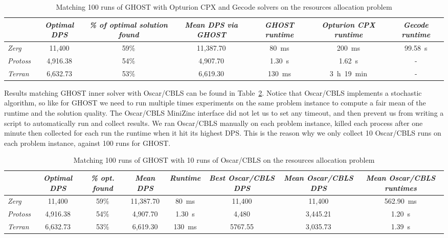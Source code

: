 \documentclass[journal]{IEEEtran}
\newcommand{\ghost}{\textsc{GHOST}\xspace}
\begin{document}
{%
\begin{table}[ht]
  \caption{Matching 100  runs of \ghost  with Opturion CPX  and Gecode
    solvers on the resources allocation problem} 
    \label{tab:SOTA}
    \centering
    \begin{tabular}{|l|c|c|c|c|c|c|}
      \cline{2-7}
      \multicolumn{1}{c|}{} &  {\em Optimal  DPS}& {\em \%  of optimal
        solution found} 
      & {\em Mean DPS via \ghost}& {\em \ghost runtime}
      & {\em Opturion CPX runtime}& {\em Gecode runtime} \\
      \hline
      {\em Zerg} & 11,400 & 59\% & 11,387.70 & 80~ms & 200~ms & 99.58~s\\
      {\em Protoss} & 4,916.38 & 54\% & 4,907.70 & 1.30~s & 1.62~s & - \\ 
      {\em Terran} & 6,632.73 & 53\% & 6,619.30 & 130~ms & 3~h~19~min & - \\ 
      \hline
    \end{tabular}  
\end{table}

Results matching \ghost  inner solver with Oscar/CBLS can  be found in
Table~\ref{tab:oscar}. Notice that  Oscar/CBLS implements a stochastic
algorithm,  so  like  for  \ghost   we  need  to  run  multiple  times
experiments on the same problem instance to compute a fair mean of the
runtime and  the solution quality.  The  Oscar/CBLS MiniZinc interface
did not let us to set any  timeout, and then prevent us from writing a
script to  automatically run  and collect  results. We  ran Oscar/CBLS
manually  on each  problem  instance, killed  each  process after  one
minute then collected for each run the runtime when it hit its highest
DPS. This is the reason why we only collect 10 Oscar/CBLS runs on each
problem instance, against 100 runs for \ghost.

\begin{table}[ht]
  \caption{Matching 100 runs of \ghost with 10 runs of Oscar/CBLS on the resources allocation problem} 
    \label{tab:oscar}
    \centering
    \begin{tabular}{|l|c|c|c|c|c|c|c|}
      \cline{2-8}
      \multicolumn{1}{c|}{} & {\em Optimal DPS}& {\em \% opt. found} 
      & {\em Mean DPS}& {\em Runtime}
      & {\em Best Oscar/CBLS DPS}& {\em Mean Oscar/CBLS DPS}
      & {\em Mean Oscar/CBLS runtimes} \\
      \hline
      {\em Zerg} & 11,400 & 59\% & 11,387.70 & 80~ms & 11,400 & 11,400 &
      562.90~ms\\
      {\em Protoss}  & 4,916.38  & 54\%  & 4,907.70 &  1.30~s &  4,480 &
      3,445.21 & 1.20~s\\ 
      {\em Terran}  & 6,632.73 & 53\%  & 6,619.30 & 130~ms  & 5767.55 &
      3,035.73 & 1.39~s \\ 
      \hline
    \end{tabular}  
\end{table}

}
\end{document}
